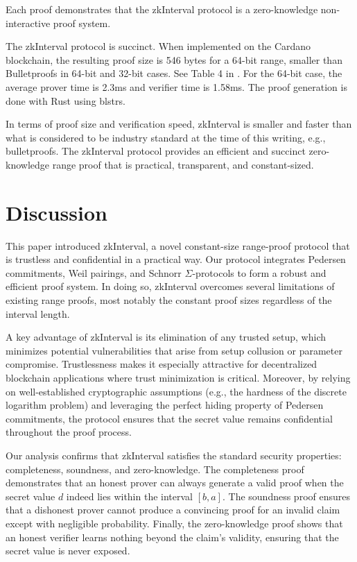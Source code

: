 \documentclass{iacrcc}
\theoremstyle{definition}
\begin{document}
Each proof demonstrates that the zkInterval protocol is a zero-knowledge non-interactive proof system.

The zkInterval protocol is succinct. When implemented on the Cardano blockchain, the resulting proof size is 546 bytes for a 64-bit range, smaller than Bulletproofs in 64-bit and 32-bit cases. See Table 4 in \cite{christetal2024}. For the 64-bit case, the average prover time is 2.3ms and verifier time is 1.58ms. The proof generation is done with Rust using blstrs.

In terms of proof size and verification speed, zkInterval is smaller and faster than what is considered to be industry standard at the time of this writing, e.g., bulletproofs. The zkInterval protocol provides an efficient and succinct zero-knowledge range proof that is practical, transparent, and constant-sized.

\section{Discussion}

This paper introduced zkInterval, a novel constant-size range-proof protocol that is trustless and confidential in a practical way. Our protocol integrates Pedersen commitments, Weil pairings, and Schnorr \(\Sigma\)-protocols to form a robust and efficient proof system. In doing so, zkInterval overcomes several limitations of existing range proofs, most notably the constant proof sizes regardless of the interval length.

A key advantage of zkInterval is its elimination of any trusted setup, which minimizes potential vulnerabilities that arise from setup collusion or parameter compromise. Trustlessness makes it especially attractive for decentralized blockchain applications where trust minimization is critical. Moreover, by relying on well-established cryptographic assumptions (e.g., the hardness of the discrete logarithm problem) and leveraging the perfect hiding property of Pedersen commitments, the protocol ensures that the secret value remains confidential throughout the proof process.

Our analysis confirms that zkInterval satisfies the standard security properties: completeness, soundness, and zero-knowledge. The completeness proof demonstrates that an honest prover can always generate a valid proof when the secret value \(d\) indeed lies within the interval \([b, a]\). The soundness proof ensures that a dishonest prover cannot produce a convincing proof for an invalid claim except with negligible probability. Finally, the zero-knowledge proof shows that an honest verifier learns nothing beyond the claim's validity, ensuring that the secret value is never exposed.
\end{document}
